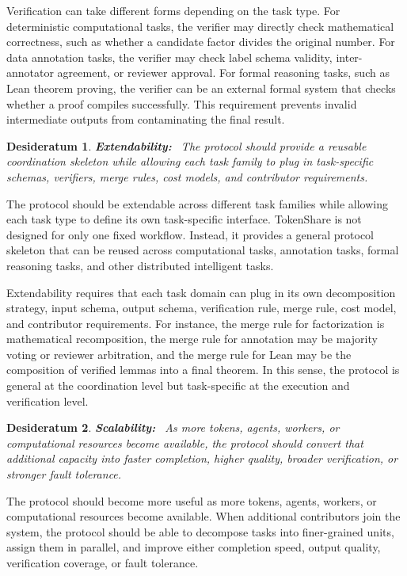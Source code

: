 \documentclass{article}
\theoremstyle{plain}
\newtheorem{desideratum}{Desideratum}
\begin{document}
Verification can take different forms depending on the task type. For deterministic computational tasks, the verifier may directly check mathematical correctness, such as whether a candidate factor divides the original number. For data annotation tasks, the verifier may check label schema validity, inter-annotator agreement, or reviewer approval. For formal reasoning tasks, such as Lean theorem proving, the verifier can be an external formal system that checks whether a proof compiles successfully. This requirement prevents invalid intermediate outputs from contaminating the final result.


\begin{desideratum}
\textbf{Extendability:}~ The protocol should provide a reusable coordination skeleton while allowing each task family to plug in task-specific schemas, verifiers, merge rules, cost models, and contributor requirements.
\end{desideratum}

The protocol should be extendable across different task families while allowing each task type to define its own task-specific interface. TokenShare is not designed for only one fixed workflow. Instead, it provides a general protocol skeleton that can be reused across computational tasks, annotation tasks, formal reasoning tasks, and other distributed intelligent tasks.

Extendability requires that each task domain can plug in its own decomposition strategy, input schema, output schema, verification rule, merge rule, cost model, and contributor requirements. For instance, the merge rule for factorization is mathematical recomposition, the merge rule for annotation may be majority voting or reviewer arbitration, and the merge rule for Lean may be the composition of verified lemmas into a final theorem. In this sense, the protocol is general at the coordination level but task-specific at the execution and verification level.


\begin{desideratum}
\textbf{Scalability:}~ As more tokens, agents, workers, or computational resources become available, the protocol should convert that additional capacity into faster completion, higher quality, broader verification, or stronger fault tolerance.
\end{desideratum}

The protocol should become more useful as more tokens, agents, workers, or computational resources become available. When additional contributors join the system, the protocol should be able to decompose tasks into finer-grained units, assign them in parallel, and improve either completion speed, output quality, verification coverage, or fault tolerance.
\end{document}
